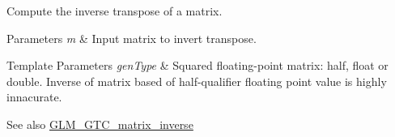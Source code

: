 Compute the inverse transpose of a matrix.


\begin{DoxyParams}{Parameters}
{\em m} & Input matrix to invert transpose. \\
\hline
\end{DoxyParams}

\begin{DoxyTemplParams}{Template Parameters}
{\em gen\+Type} & Squared floating-\/point matrix\+: half, float or double. Inverse of matrix based of half-\/qualifier floating point value is highly innacurate. \\
\hline
\end{DoxyTemplParams}
\begin{DoxySeeAlso}{See also}
\hyperlink{group__gtc__matrix__inverse}{G\+L\+M\+\_\+\+G\+T\+C\+\_\+matrix\+\_\+inverse} 
\end{DoxySeeAlso}
